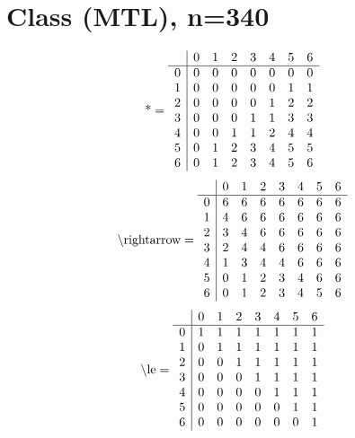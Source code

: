 \documentclass[11pt]{article}
\begin{document}
\section{Class (MTL), n=340}
\[\text{*} = 
\begin{array}{r | r r r r r r r}
 & 0 & 1 & 2 & 3 & 4 & 5 & 6 \\ \hline
0 & 0 & 0 & 0 & 0 & 0 & 0 & 0 \\
1 & 0 & 0 & 0 & 0 & 0 & 1 & 1 \\
2 & 0 & 0 & 0 & 0 & 1 & 2 & 2 \\
3 & 0 & 0 & 0 & 1 & 1 & 3 & 3 \\
4 & 0 & 0 & 1 & 1 & 2 & 4 & 4 \\
5 & 0 & 1 & 2 & 3 & 4 & 5 & 5 \\
6 & 0 & 1 & 2 & 3 & 4 & 5 & 6 \\
\end{array}
\]
\[\text{\textbackslash rightarrow} = 
\begin{array}{r | r r r r r r r}
 & 0 & 1 & 2 & 3 & 4 & 5 & 6 \\ \hline
0 & 6 & 6 & 6 & 6 & 6 & 6 & 6 \\
1 & 4 & 6 & 6 & 6 & 6 & 6 & 6 \\
2 & 3 & 4 & 6 & 6 & 6 & 6 & 6 \\
3 & 2 & 4 & 4 & 6 & 6 & 6 & 6 \\
4 & 1 & 3 & 4 & 4 & 6 & 6 & 6 \\
5 & 0 & 1 & 2 & 3 & 4 & 6 & 6 \\
6 & 0 & 1 & 2 & 3 & 4 & 5 & 6 \\
\end{array}
\]
\[\text{\textbackslash le} = 
\begin{array}{r | r r r r r r r}
 & 0 & 1 & 2 & 3 & 4 & 5 & 6 \\ \hline
0 & 1 & 1 & 1 & 1 & 1 & 1 & 1 \\
1 & 0 & 1 & 1 & 1 & 1 & 1 & 1 \\
2 & 0 & 0 & 1 & 1 & 1 & 1 & 1 \\
3 & 0 & 0 & 0 & 1 & 1 & 1 & 1 \\
4 & 0 & 0 & 0 & 0 & 1 & 1 & 1 \\
5 & 0 & 0 & 0 & 0 & 0 & 1 & 1 \\
6 & 0 & 0 & 0 & 0 & 0 & 0 & 1 \\
\end{array}
\]
\end{document}
